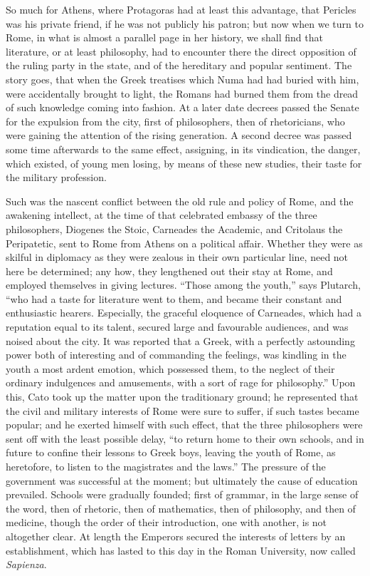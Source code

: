 So much for Athens, where Protagoras had at least this advantage,
that Pericles was his private friend, if he was not publicly his
patron; but now when we turn to Rome, in what is almost a parallel
page in her history, we shall find that literature, or at least
philosophy, had to encounter there the direct opposition of the ruling
party in the state, and of the hereditary and popular sentiment. The
story goes, that when the Greek treatises which Numa had had buried
with him, were accidentally brought to light, the Romans had burned
them from the dread of such knowledge coming into fashion. At a later
date decrees passed the Senate for the expulsion from the city, first
of philosophers, then of rhetoricians, who were gaining the attention
of the rising generation. A second decree was passed some time
afterwards to the same effect, assigning, in its vindication, the
danger, which existed, of young men losing, by means of these new
studies, their taste for the military profession.

Such was the nascent conflict between the old rule and policy of
Rome, and the awakening intellect, at the time of that celebrated
embassy of the three philosophers, Diogenes the Stoic, Carneades
the Academic, and Critolaus the Peripatetic, sent to Rome from Athens
on a political affair. Whether they were as skilful in diplomacy as
they were zealous in their own particular line, need not here be
determined; any how, they lengthened out their stay at Rome, and
employed themselves in giving lectures. ``Those among the
youth,'' says Plutarch, ``who had a taste for literature went
to them, and became their constant and enthusiastic hearers.
Especially, the graceful eloquence of Carneades, which had a
reputation equal to its talent, secured large and favourable
audiences, and was noised about the city. It was reported that a
Greek, with a perfectly astounding power both of interesting and of
commanding the feelings, was kindling in the youth a most ardent
emotion, which possessed them, to the neglect of their ordinary
indulgences and amusements, with a sort of rage for philosophy.''
Upon this, Cato took up the matter upon the traditionary ground; he
represented that the civil and military interests of Rome were sure to
suffer, if such tastes became popular; and he exerted himself with
such effect, that the three philosophers were sent off with the least
possible delay, ``to return home to their own schools, and in
future to confine their lessons to Greek boys, leaving the youth of
Rome, as heretofore, to listen to the magistrates and the laws.''
The pressure of the government was successful at the moment; but
ultimately the cause of education prevailed. Schools were gradually
founded; first of grammar, in the large sense of the word, then of
rhetoric, then of mathematics, then of philosophy, and then of
medicine, though the order of their introduction, one with another, is
not altogether clear. At length the Emperors secured the interests of
letters by an establishment, which has lasted to this day in the
Roman University, now called \emph{Sapienza}.

